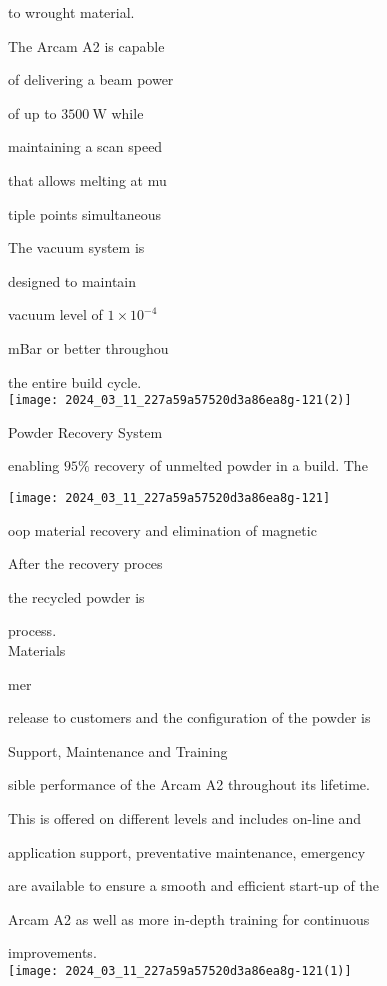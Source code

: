 \documentclass[10pt]{article}
\begin{document}
to wrought material.

The Arcam A2 is capable

of delivering a beam power

of up to $3500 \mathrm{~W}$ while

maintaining a scan speed

that allows melting at mu

tiple points simultaneous

The vacuum system is

designed to maintain

vacuum level of $1 \times 10^{-4}$

mBar or better throughou

the entire build cycle.\\
\texttt{[image: 2024\_03\_11\_227a59a57520d3a86ea8g-121(2)]}

Powder Recovery System

enabling $95 \%$ recovery of unmelted powder in a build. The

\begin{center}
\texttt{[image: 2024\_03\_11\_227a59a57520d3a86ea8g-121]}
\end{center}

oop material recovery and elimination of magnetic

After the recovery proces

the recycled powder is

process.\\
Materials

mer

release to customers and the configuration of the powder is

Support, Maintenance and Training

sible performance of the Arcam A2 throughout its lifetime.

This is offered on different levels and includes on-line and

application support, preventative maintenance, emergency

are available to ensure a smooth and efficient start-up of the

Arcam A2 as well as more in-depth training for continuous

improvements.\\
\texttt{[image: 2024\_03\_11\_227a59a57520d3a86ea8g-121(1)]}
\end{document}
